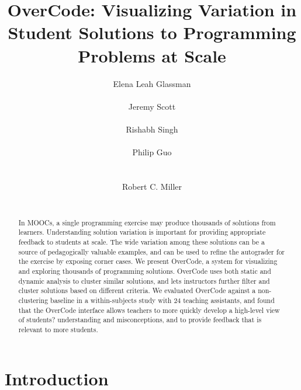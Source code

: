 \documentclass{sigchi}
\begin{document}
\title{OverCode: Visualizing Variation in Student Solutions to Programming Problems at Scale}

\author{
  \alignauthor Elena Leah Glassman\\
    \\
  \alignauthor Jeremy Scott\\
    \\
  \alignauthor Rishabh Singh\\
    \\
      \alignauthor Philip Guo\\
      \\
      \\
            \alignauthor Robert C. Miller\\
      \\
}


\maketitle

\begin{abstract}
In MOOCs, a single programming exercise may produce thousands of solutions from learners. Understanding solution variation is important for providing appropriate feedback to students at scale.  The wide variation among these solutions can be a source of pedagogically valuable examples, and can be used to refine the autograder for the exercise by exposing corner cases. 
We present OverCode, a system for visualizing and exploring thousands of programming solutions. OverCode uses both static and dynamic analysis to cluster similar solutions, and lets instructors further filter and cluster solutions based on different criteria.
We evaluated OverCode against a non-clustering baseline in a within-subjects study with 24 teaching assistants, and found that the OverCode interface allows teachers to more quickly develop a high-level view of students? understanding and misconceptions, and to provide feedback that is relevant to more students.
\end{abstract}


\section{Introduction}
\end{document}
